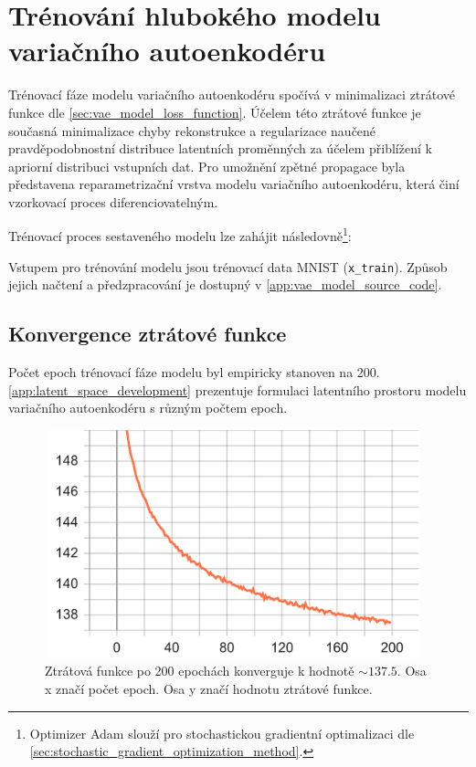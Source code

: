 \section{Trénování hlubokého modelu variačního autoenkodéru}
Trénovací fáze modelu variačního autoenkodéru spočívá v minimalizaci ztrátové funkce dle \autoref{sec:vae_model_loss_function}.
Účelem této ztrátové funkce je současná minimalizace chyby rekonstrukce a regularizace naučené pravděpodobnostní distribuce latentních proměnných za účelem přiblížení k apriorní distribuci vstupních dat.
Pro umožnění zpětné propagace byla představena reparametrizační vrstva modelu variačního autoenkodéru, která činí vzorkovací proces diferenciovatelným.

Trénovací proces sestaveného modelu lze zahájit následovně\footnote{Optimizer Adam slouží pro stochastickou gradientní optimalizaci dle \autoref{sec:stochastic_gradient_optimization_method}.}:


Vstupem pro trénování modelu jsou trénovací data MNIST (\lstinline{x_train}). Způsob jejich načtení a předzpracování je dostupný v \autoref{app:vae_model_source_code}.

\subsection{Konvergence ztrátové funkce}
Počet epoch trénovací fáze modelu byl empiricky stanoven na 200. \autoref{app:latent_space_development} prezentuje formulaci latentního prostoru modelu variačního autoenkodéru s různým počtem epoch.
\begin{figure}[H]
    \centering
    \includegraphics[width=0.97\textwidth]{figures/epoch_total_loss.pdf}
    \caption{Ztrátová funkce po 200 epochách konverguje k hodnotě $\sim 137.5$. Osa x značí počet epoch. Osa y značí hodnotu ztrátové funkce.}
\end{figure}

